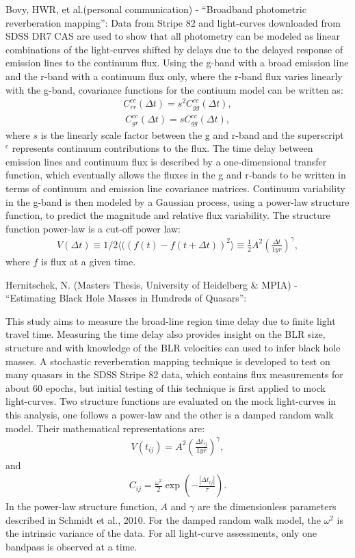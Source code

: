 \documentclass[letterpaper,12pt,preprint]{aastex}
\begin{document}
Bovy, HWR, et al.(personal communication) - ``Broadband photometric
reverberation mapping'': Data from Stripe 82 and light-curves
downloaded from SDSS DR7 CAS are used to show that all photometry can
be modeled as linear combinations of the light-curves shifted by
delays due to the delayed response of emission lines to the continuum flux.
Using the g-band with a broad emission line and the r-band with a
continuum flux only, where the r-band flux varies linearly with the
g-band, covariance functions for the contiuum model can be written as:
\begin{eqnarray}
C^{cc}_{rr}(\Delta t)=s^2C^{cc}_{gg}(\Delta t),
\end{eqnarray} 
\begin{eqnarray}
C^{cc}_{gr}(\Delta t)=s C^{cc}_{gg}(\Delta t),
\end{eqnarray}
where $s$ is the linearly scale factor between the g and r-band and
the superscript $^c$ represents continuum contributions to the
flux. The time delay between emission lines and continuum flux is
described by a one-dimensional transfer function, which eventually
allows the fluxes in the g and r-bands to be written in terms of
continuum and emission line covariance matrices.  Continuum
variability in the g-band is then modeled by a Gaussian process, using
a power-law structure function, to predict the magnitude and relative
flux variability. The structure function power-law is a cut-off power
law:
\begin{eqnarray}
V(\Delta t)\equiv1/2\langle((f(t)-f(t+\Delta t))^2\rangle \equiv
\frac{1}{2} A^2 \left(\frac{\Delta t}{1 yr}\right)^\gamma,
\end{eqnarray}
where $f$ is flux at a given time.

Hernitschek, N. (Masters Thesis, University of Heidelberg \& MPIA) -
``Estimating Black Hole Masses in Hundreds of Quasars'':

This study aims to measure the broad-line region time delay due to
finite light travel time. Measuring the time delay also provides
insight on the BLR size, structure and with knowledge of the BLR
velocities can used to infer black hole masses. A stochastic
reverberation mapping technique is developed to test on many quasars
in the SDSS Stripe 82 data, which contains flux measurements for about
60 epochs, but initial testing of this technique is first applied to
mock light-curves. Two structure functions are evaluated on the mock
light-curves in this analysis, one follows a power-law and the other
is a damped random walk model. Their mathematical representations are:
\begin{eqnarray}
V(t_{ij})=A^2 \left(\frac{\Delta t_{ij}}{1 yr}\right) ^\gamma,
\end{eqnarray} and
\begin{eqnarray}
C_{ij}=\frac{\omega ^2}{2} \exp \left(- \frac {|\Delta t_{ij}|}{\tau}\right).
\end {eqnarray}
In the power-law structure function, $A$ and $\gamma$ are the
dimensionless parameters described in Schmidt et al., 2010. For the
damped random walk model, the $\omega ^2$ is the intrinsic variance of
the data. For all light-curve assessments, only one bandpass is
observed at a time.
\end{document}
